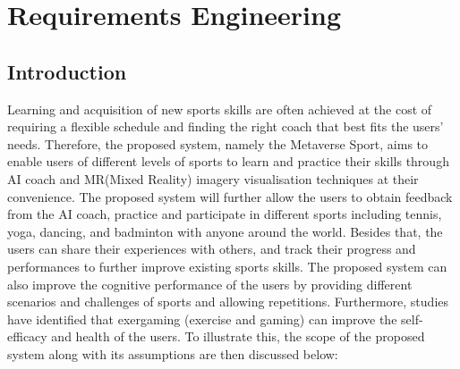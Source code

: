 \documentclass[a4paper]{article}
\begin{document}
	\section{Requirements Engineering}

	\subsection{Introduction}

	Learning and acquisition of new sports skills are often achieved at the cost of requiring a flexible schedule and finding the right coach that best fits the users' needs. Therefore, the proposed system, namely the Metaverse Sport, aims to enable users of different levels of sports to learn and practice their skills through AI coach and MR(Mixed Reality) imagery visualisation techniques at their convenience. The proposed system will further allow the users to obtain feedback from the AI coach, practice and participate in different sports including tennis, yoga, dancing, and badminton with anyone around the world. Besides that, the users can share their experiences with others, and track their progress and performances to further improve existing sports skills. The proposed system can also improve the cognitive performance of the users by providing different scenarios and challenges of sports and allowing repetitions. Furthermore, studies have identified that exergaming (exercise and gaming) can improve the self-efficacy and health of the users\cite{ref4}. To illustrate this, the scope of the proposed system along with its assumptions are then discussed below:\\

\end{document}
